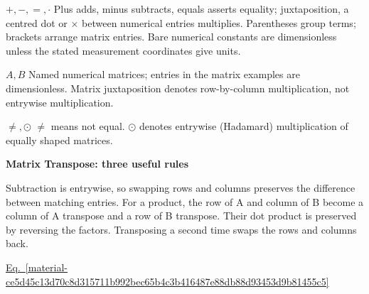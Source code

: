 \documentclass[11pt,a4paper]{article}
\begin{document}
\begin{minipage}{\linewidth}
\par\noindent\textbf{\(+,-,=,\cdot\)} Plus adds, minus subtracts, equals asserts equality; juxtaposition, a centred dot or \ensuremath{\times} between numerical entries multiplies. Parentheses group terms; brackets arrange matrix entries. Bare numerical constants are dimensionless unless the stated measurement coordinates give units.

\par\noindent\textbf{\(A,B\)} Named numerical matrices; entries in the matrix examples are dimensionless. Matrix juxtaposition denotes row-by-column multiplication, not entrywise multiplication.

\par\noindent\textbf{\(\ne,\odot\)} \ensuremath{\ne} means not equal. \ensuremath{\odot} denotes entrywise (Hadamard) multiplication of equally shaped matrices.

\end{minipage}\par
\medskip

\textbf{Matrix Transpose: three useful rules}


Subtraction is entrywise, so swapping rows and columns preserves the difference between matching entries. For a product, the row of A and column of B become a column of A transpose and a row of B transpose. Their dot product is preserved by reversing the factors. Transposing a second time swaps the rows and columns back.


\hyperref[material-ce5d45c13d70c8d315711b992bec65b4c3b416487e88db88d93453d9b81455c5]{Eq.~\ref*{material-ce5d45c13d70c8d315711b992bec65b4c3b416487e88db88d93453d9b81455c5}}
\end{document}

